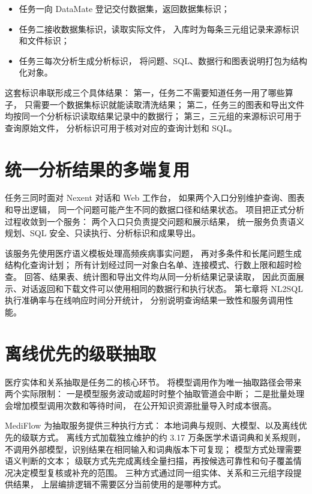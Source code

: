 \begin{itemize}
  \item 任务一向 DataMate 登记交付数据集，返回数据集标识；
  \item 任务二接收数据集标识，读取实际文件，
        入库时为每条三元组记录来源标识和文件标识；
  \item 任务三每次分析生成分析标识，
        将问题、SQL、数据行和图表说明打包为结构化对象。
\end{itemize}

这套标识串联形成三个具体结果：
第一，任务二不需要知道任务一用了哪些算子，
只需要一个数据集标识就能读取清洗结果；
第二，任务三的图表和导出文件均按同一个分析标识读取结果记录中的数据行；
第三，三元组的来源标识可用于查询原始文件，
分析标识可用于核对对应的查询计划和 SQL。

\section{统一分析结果的多端复用}

任务三同时面对 Nexent 对话和 Web 工作台，
如果两个入口分别维护查询、图表和导出逻辑，
同一个问题可能产生不同的数据口径和结果状态。
项目把正式分析过程收敛到一个服务：
两个入口只负责提交问题和展示结果，
统一服务负责语义规划、SQL 安全、只读执行、分析标识和成果导出。

该服务先使用医疗语义模板处理高频疾病事实问题，
再对多条件和长尾问题生成结构化查询计划；
所有计划经过同一对象白名单、连接模式、行数上限和超时检查。
回答、结果表、统计图和导出文件均从同一分析结果记录读取，
因此页面展示、对话返回和下载文件可以使用相同的数据行和执行状态。
第七章将 NL2SQL 执行准确率与在线响应时间分开统计，
分别说明查询结果一致性和服务调用性能。

\section{离线优先的级联抽取}

医疗实体和关系抽取是任务二的核心环节。
将模型调用作为唯一抽取路径会带来两个实际限制：
一是模型服务波动或超时时整个抽取管道会中断；
二是批量处理会增加模型调用次数和等待时间，
在公开知识资源批量导入时成本很高。

MediFlow 为抽取服务提供三种执行方式：
本地词典与规则、大模型、以及离线优先的级联方式。
离线方式加载独立维护的约 3.17 万条医学术语词典和关系规则，
不调用外部模型，识别结果在相同输入和词典版本下可复现；
模型方式处理需要语义判断的文本；
级联方式先完成离线全量扫描，再按候选可靠性和句子覆盖情况决定模型复核或补充的范围。
三种方式通过同一组实体、关系和三元组字段提供结果，
上层编排逻辑不需要区分当前使用的是哪种方式。

